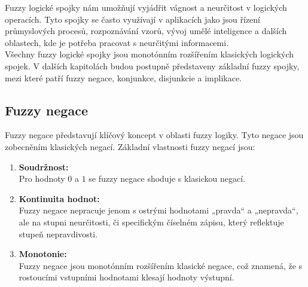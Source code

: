 Fuzzy logické spojky n\'am umo\v z\v nují vyjádřit vágnost a neurčitost v logických operacích. Tyto spojky se často využívají v aplikacích jako jsou řízení průmyslových procesů, rozpoznávání vzorů, vývoj umělé inteligence a dalších oblastech, kde je potřeba pracovat s neurčitými informacemi.\\
V\v sechny fuzzy logick\'e spojky jsou monot\'onn\'im roz\v s\'i\v ren\'im klasick\'ych logick\'ych spojek. V dalších kapitolách budou postupně představeny základní fuzzy spojky, mezi kter\'e  patří 
fuzzy negace, konjunkce, disjunkcie a implikace. 

\subsection{Fuzzy negace}

Fuzzy negace představují klíčový koncept v oblasti fuzzy logiky. Tyto negace jsou zobecn\v en\'im klasick\'ych negac\'i. Základní vlastnosti fuzzy negací jsou:

\begin{enumerate}
\item \textbf{Soudržnost:}\\
Pro hodnoty $0$ a $1$ se fuzzy negace shoduje s klasickou negac\'i.
    \item \textbf{Kontinuita hodnot:} \\
        Fuzzy negace nepracuje jenom s  ostrými hodnotami „pravda“ a „nepravda“, ale na stupni neurčitosti, či specifickým číselném zápisu, který reflektuje stupeň nepravdivosti.
    \item \textbf{Monotonie:} \\
        Fuzzy negace jsou monot\'onn\'im roz\v s\'i\v ren\'im klasick\'e negace, což znamená, že s rostoucími vstupn\'imi hodnotami klesaj\'i hodnoty výstupn\'i.
    
\end{enumerate}

